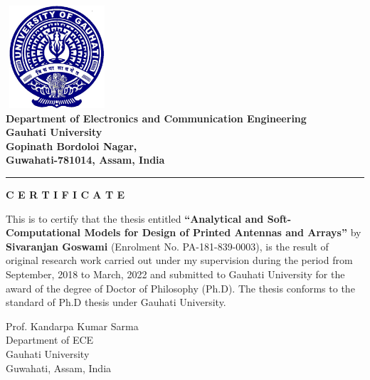 \begin{center}
\includegraphics[width=1.5in,height=1.5in]{clogoe.eps} \\

{\bf Department of Electronics and Communication Engineering \\
Gauhati University \\
Gopinath Bordoloi Nagar, \\
Guwahati-781014, Assam, India \\}
\rule{\linewidth}{2mm} \pagestyle{empty} \vspace{0.25in}

{\bf \large C E R T I F I C A T E}
\end{center}

\par

This is to certify that the thesis entitled {\bf ``Analytical and Soft-Computational Models for Design of Printed Antennas and Arrays''} by {\bf Sivaranjan Goswami} (Enrolment No. PA-181-839-0003), is the result of original research work carried out under my supervision during the period from September, 2018 to March, 2022 and submitted to Gauhati University for the award of the degree of Doctor of Philosophy (Ph.D). The thesis conforms to the standard of Ph.D thesis under Gauhati University.\\
\vspace*{20mm}

\bigskip\medskip

\noindent  Prof. Kandarpa Kumar Sarma\\ Department of ECE\\ Gauhati University \\ Guwahati, Assam, India\\

\noindent
\newpage 